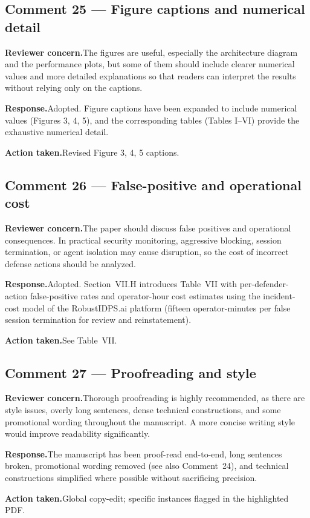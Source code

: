 \documentclass[11pt,a4paper]{article}
\newcommand{\concern}[1]{\noindent\textbf{Reviewer concern.}\quad #1\par\vspace{0.3em}}
\newcommand{\response}[1]{\noindent\textbf{Response.}\quad #1\par\vspace{0.3em}}
\newcommand{\action}[1]{\noindent\textbf{Action taken.}\quad #1\par\vspace{0.8em}}
\begin{document}
\subsection*{Comment 25 --- Figure captions and numerical detail}
\concern{The figures are useful, especially the architecture diagram and the performance plots, but some of them should include clearer numerical values and more detailed explanations so that readers can interpret the results without relying only on the captions.}
\response{Adopted. Figure captions have been expanded to include numerical values (Figures 3, 4, 5), and the corresponding tables (Tables I--VI) provide the exhaustive numerical detail.}
\action{Revised Figure 3, 4, 5 captions.}

\subsection*{Comment 26 --- False-positive and operational cost}
\concern{The paper should discuss false positives and operational consequences. In practical security monitoring, aggressive blocking, session termination, or agent isolation may cause disruption, so the cost of incorrect defense actions should be analyzed.}
\response{Adopted. Section~VII.H introduces Table~VII with per-defender-action false-positive rates and operator-hour cost estimates using the incident-cost model of the RobustIDPS.ai platform (fifteen operator-minutes per false session termination for review and reinstatement).}
\action{See Table~VII.}

\subsection*{Comment 27 --- Proofreading and style}
\concern{Thorough proofreading is highly recommended, as there are style issues, overly long sentences, dense technical constructions, and some promotional wording throughout the manuscript. A more concise writing style would improve readability significantly.}
\response{The manuscript has been proof-read end-to-end, long sentences broken, promotional wording removed (see also Comment~24), and technical constructions simplified where possible without sacrificing precision.}
\action{Global copy-edit; specific instances flagged in the highlighted PDF.}
\end{document}
